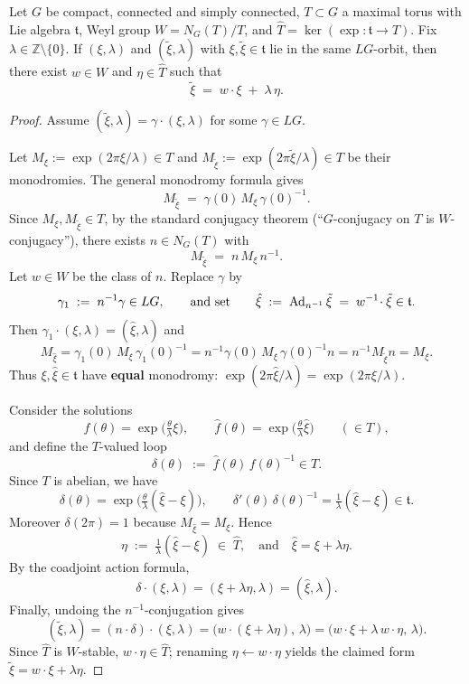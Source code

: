 \documentclass[12pt]{article}
\begin{document}
\begin{lemma}
    Let $G$ be compact, connected and simply connected, $T\subset G$ a maximal
    torus with Lie algebra $\mathfrak t$, Weyl group $W=N_G(T)/T$, and
    $\widehat T=\ker(\exp:\mathfrak t\to T)$. Fix $\lambda\in\mathbb Z\setminus\{0\}$.
    If $(\xi,\lambda)$ and $(\tilde\xi,\lambda)$ with $\xi,\tilde\xi\in\mathfrak t$
    lie in the same $LG$-orbit, then there exist $w\in W$ and $\eta\in\widehat T$
    such that
    \[
        \tilde\xi \;=\; w\!\cdot\xi \;+\; \lambda\,\eta.
    \]
\end{lemma}

\begin{proof}
    Assume $(\tilde\xi,\lambda)=\gamma\cdot(\xi,\lambda)$ for some $\gamma\in LG$.

    Let $M_\xi:=\exp(2\pi\xi/\lambda)\in T$ and $M_{\tilde\xi}:=\exp(2\pi\tilde\xi/\lambda)\in T$
    be their monodromies. The general monodromy formula gives
    \[
        M_{\tilde\xi} \;=\; \gamma(0)\,M_\xi\,\gamma(0)^{-1}.
    \]
    Since $M_\xi,M_{\tilde\xi}\in T$, by the standard conjugacy theorem
    (“$G$-conjugacy on $T$ is $W$-conjugacy”), there exists $n\in N_G(T)$ with
    \[
        M_{\tilde\xi} \;=\; n\,M_\xi\,n^{-1}.
    \]
    Let $w\in W$ be the class of $n$. Replace $\gamma$ by
    \[
        \gamma_1 \;:=\; n^{-1}\gamma \in LG,
        \qquad
        \text{and set}\qquad
        \hat\xi \;:=\; \operatorname{Ad}_{n^{-1}}\tilde\xi \;=\; w^{-1}\!\cdot\tilde\xi \in \mathfrak t.
    \]
    Then $\gamma_1\cdot(\xi,\lambda)=(\hat\xi,\lambda)$ and
    \[
        M_{\hat\xi}
        = \gamma_1(0)\,M_\xi\,\gamma_1(0)^{-1}
        = n^{-1}\gamma(0)\,M_\xi\,\gamma(0)^{-1}n
        = n^{-1}M_{\tilde\xi}n
        = M_\xi.
    \]
    Thus $\xi,\hat\xi\in\mathfrak t$ have \textbf{equal} monodromy:
    $\exp(2\pi\hat\xi/\lambda)=\exp(2\pi\xi/\lambda)$.

    Consider the solutions
    \[
        f(\theta)=\exp\!\Big(\tfrac{\theta}{\lambda}\xi\Big),\qquad
        \hat f(\theta)=\exp\!\Big(\tfrac{\theta}{\lambda}\hat\xi\Big)\qquad(\in T),
    \]
    and define the $T$-valued loop
    \[
        \delta(\theta)\;:=\;\hat f(\theta)\,f(\theta)^{-1}\in T.
    \]
    Since $T$ is abelian, we have
    \[
        \delta(\theta)=\exp\!\Big(\tfrac{\theta}{\lambda}(\hat\xi-\xi)\Big),
        \qquad
        \delta'(\theta)\,\delta(\theta)^{-1}=\tfrac{1}{\lambda}(\hat\xi-\xi)\in\mathfrak t.
    \]
    Moreover $\delta(2\pi)=1$ because $M_{\hat\xi}=M_\xi$. Hence
    \[
        \eta\;:=\;\tfrac{1}{\lambda}(\hat\xi-\xi)\;\in\;\widehat T,
        \quad\text{and}\quad
        \hat\xi=\xi+\lambda\eta.
    \]
    By the coadjoint action formula,
    \[
        \delta\cdot(\xi,\lambda)=(\xi+\lambda\eta,\lambda)=(\hat\xi,\lambda).
    \]
    Finally, undoing the $n^{-1}$-conjugation gives
    \[
        (\tilde\xi,\lambda)
        =(n\cdot\delta)\cdot(\xi,\lambda)
        =\Big(w\!\cdot(\xi+\lambda\eta),\,\lambda\Big)
        =\Big(w\!\cdot\xi+\lambda\,w\!\cdot\eta,\,\lambda\Big).
    \]
    Since $\widehat T$ is $W$-stable, $w\!\cdot\eta\in\widehat T$; renaming
    $\eta\leftarrow w\!\cdot\eta$ yields the claimed form
    $\tilde\xi=w\!\cdot\xi+\lambda\eta$.
\end{proof}
\end{document}
